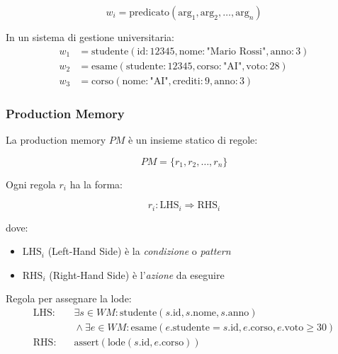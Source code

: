\begin{equation}
w_i = \text{predicato}(\text{arg}_1, \text{arg}_2, \ldots, \text{arg}_n)
\end{equation}

\begin{esempio}
In un sistema di gestione universitaria:
\begin{align*}
w_1 &= \text{studente}(\text{id}: 12345, \text{nome}: \text{"Mario Rossi"}, \text{anno}: 3)\\
w_2 &= \text{esame}(\text{studente}: 12345, \text{corso}: \text{"AI"}, \text{voto}: 28)\\
w_3 &= \text{corso}(\text{nome}: \text{"AI"}, \text{crediti}: 9, \text{anno}: 3)
\end{align*}
\end{esempio}

\subsubsection{Production Memory}

La production memory $PM$ è un insieme statico di regole:

\begin{equation}
PM = \{r_1, r_2, \ldots, r_n\}
\end{equation}

Ogni regola $r_i$ ha la forma:

\begin{equation}
r_i: \text{LHS}_i \Rightarrow \text{RHS}_i
\end{equation}

dove:
\begin{itemize}
\item $\text{LHS}_i$ (Left-Hand Side) è la \textit{condizione} o \textit{pattern}
\item $\text{RHS}_i$ (Right-Hand Side) è l'\textit{azione} da eseguire
\end{itemize}

\begin{esempio}
Regola per assegnare la lode:
\begin{equation*}
\begin{split}
\text{LHS}: &\quad \exists s \in WM: \text{studente}(s.\text{id}, s.\text{nome}, s.\text{anno})\\
&\quad \land \exists e \in WM: \text{esame}(e.\text{studente} = s.\text{id}, e.\text{corso}, e.\text{voto} \geq 30)\\
\text{RHS}: &\quad \text{assert}(\text{lode}(s.\text{id}, e.\text{corso}))
\end{split}
\end{equation*}
\end{esempio}

